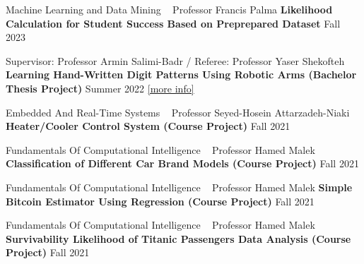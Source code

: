 \begin{cventries}
  
    \cventry
    {Machine Learning and Data Mining ~ Professor Francis Palma}
    {\textbf {Likelihood Calculation for Student Success Based on Preprepared Dataset}}
    {}
    {Fall 2023}
    {}
    \vspace{0.35 cm}
  
  

    \cventry
    {Supervisor: Professor Armin Salimi-Badr / Referee: Professor Yaser Shekofteh}
    {\textbf {Learning Hand-Written Digit Patterns Using Robotic Arms (Bachelor Thesis Project)}}
    {}
    {Summer 2022}
    {\href{https://ph504.github.io/portfolio/portfolio-1/}{\textcolor{cobalt}{[more info]}}\newline}
    \vspace{0.35 cm}
    
    
    \cventry
    {Embedded And Real-Time Systems ~ Professor Seyed-Hosein Attarzadeh-Niaki}
    {\textbf {Heater/Cooler Control System (Course Project)}}
    {}
    {Fall 2021}
    {}
    \vspace{0.35 cm}
    
      \cventry
    {Fundamentals Of Computational Intelligence ~ Professor Hamed Malek}
    {\textbf {Classification of Different Car Brand Models (Course Project)}}
    {}
    {Fall 2021}
    {}
    \vspace{0.35 cm}
	
	    \cventry
    {Fundamentals Of Computational Intelligence ~ Professor Hamed Malek}
    {\textbf {Simple Bitcoin Estimator Using Regression (Course Project)}}
    {}
    {Fall 2021}
    {}
    \vspace{0.35 cm}

      \cventry
    {Fundamentals Of Computational Intelligence ~ Professor Hamed Malek}
    {\textbf {Survivability Likelihood of Titanic Passengers Data Analysis (Course Project)}}
    {}
    {Fall 2021}
    {}
    \vspace{0.35 cm}
    

\end{cventries}
